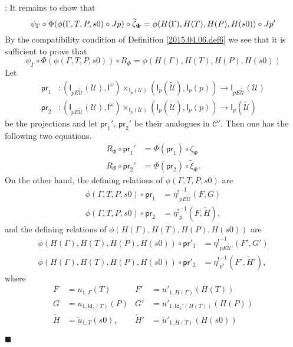 \documentclass[12pt]{article}
\numberwithin{equation}{section}
\newenvironment{myproof}{{\bf Proof}:}{$\blacksquare$ \vskip 5mm }
\newcommand{\sr}{\rightarrow}
\newcommand{\wt}{\widetilde}
\newcommand{\Idx}{\mathsf{Id}_3} %
\newcommand{\U}{\mathcal{U}}
\newcommand{\I}{\mathsf{I}}
\newcommand{\etashriek}{\eta^!}
\newcommand{\etaunshriek}{{\etashriek}^{-1}}
\newcommand{\pr}{\mathsf{pr}}
\begin{document}
\begin{myproof}
It remains to show that
%
$$\psi_{\Gamma}\circ \Phi(\phi(\Gamma,T,P,s0)\circ Jp)\circ
\wt{\zeta}_{\bf\Phi}=\phi(H(\Gamma),H(T),H(P),H(s0))\circ Jp'$$
%
By the compatibility condition of Definition \ref{2015.04.06.def6} we see that
it is sufficient to prove that
%
$$\psi_{\Gamma}\circ \Phi(\phi(\Gamma,T,P,s0))\circ R_{\Phi} =
\phi(H(\Gamma),H(T),H(P),H(s0))$$
%
Let
%
\begin{align*}
  \pr_1 & :(\I_{pE\wt{\U}}(\U),\I^{\omega})\times_{\I_{p}(\U)}(\I_{p}(\wt{\U}),\I_p(p))\sr \I_{pE\wt{\U}}(\U) \\
  \pr_2 & :(\I_{pE\wt{\U}}(\U),\I^{\omega})\times_{\I_{p}(\U)}(\I_{p}(\wt{\U}),\I_p(p))\sr \I_{p}(\wt{\U})
\end{align*}
%
be the projections and let $\pr_1'$, $\pr_2'$ be their analogues in $\mathcal
C'$. Then one has the following two equations.
%
\begin{align}
  R_{\Phi}\circ \pr_1' & =\Phi(\pr_1)\circ \zeta_{\Phi}      \label{RPhi-eqn1} \\
  R_{\Phi}\circ \pr_2' & =\Phi(\pr_2)\circ \wt{\xi}_{\Phi}.  \label{RPhi-eqn2}
\end{align}
%
On the other hand, the defining relations of $\phi(\Gamma,T,P,s0)$ are
%
\begin{align}
  \phi(\Gamma,T,P,s0)\circ \pr_1&=\etaunshriek_{pE\wt{\U}}(F,G) \label{phiGTPs-defn1} \\
  \phi(\Gamma,T,P,s0)\circ \pr_2&=\etaunshriek_p(F,\wt{H}),     \label{phiGTPs-defn2}
\end{align}
and the defining relations of $\phi(H(\Gamma),H(T),H(P),H(s0))$ are
%
\begin{align}
  \phi(H(\Gamma),H(T),H(P),H(s0)) \circ \pr'_1 &=\etaunshriek_{pE\wt{\U}'}(F',G')          \label{phiGTPs-defn1'} \\
  \phi(H(\Gamma),H(T),H(P),H(s0)) \circ \pr'_2 &=\etaunshriek_{p'}        (F',\wt H'),     \label{phiGTPs-defn2'}
\end{align}
%
where
%
\begin{align*}
  F&=u_{1,\Gamma}(T)           & F'&=u'_{1,H(\Gamma)}(H(T))         \\
  G&=u_{1,\Idx(T)}(P)          & G'&=u'_{1,\Idx'(H(T))}(H(P))       \\
  \wt{H}&=\wt{u}_{1,T}(s0),    & \wt H' &=\wt u'_{1,H(T)}(H(s0))
\end{align*}
%


\end{myproof}
\end{document}
